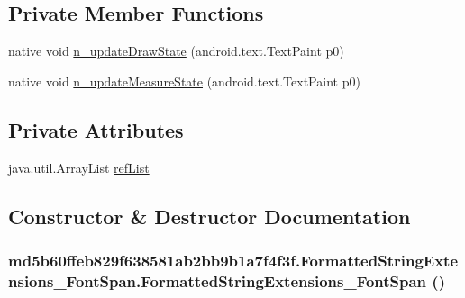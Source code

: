 \subsection*{Private Member Functions}
\begin{CompactItemize}
\item 
native void \hyperlink{classmd5b60ffeb829f638581ab2bb9b1a7f4f3f_1_1_formatted_string_extensions___font_span_b56b8a213410eeb2ba105a8554b4f74b}{n\_\-updateDrawState} (android.text.TextPaint p0)
\item 
native void \hyperlink{classmd5b60ffeb829f638581ab2bb9b1a7f4f3f_1_1_formatted_string_extensions___font_span_2ba128c6be5e9ce8349de20fbdb04e82}{n\_\-updateMeasureState} (android.text.TextPaint p0)
\end{CompactItemize}
\subsection*{Private Attributes}
\begin{CompactItemize}
\item 
java.util.ArrayList \hyperlink{classmd5b60ffeb829f638581ab2bb9b1a7f4f3f_1_1_formatted_string_extensions___font_span_a9f3fdfef1b14e27e24108ef098a9091}{refList}
\end{CompactItemize}


\subsection{Constructor \& Destructor Documentation}
\hypertarget{classmd5b60ffeb829f638581ab2bb9b1a7f4f3f_1_1_formatted_string_extensions___font_span_6bdea9f0d35607dd50fc6a79bc4a2fd8}{
\subsubsection[{FormattedStringExtensions\_\-FontSpan}]{\setlength{\rightskip}{0pt plus 5cm}md5b60ffeb829f638581ab2bb9b1a7f4f3f.FormattedStringExtensions\_\-FontSpan.FormattedStringExtensions\_\-FontSpan ()}}
\label{classmd5b60ffeb829f638581ab2bb9b1a7f4f3f_1_1_formatted_string_extensions___font_span_6bdea9f0d35607dd50fc6a79bc4a2fd8}




